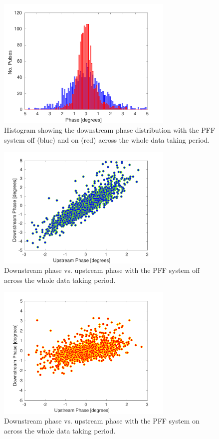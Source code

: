 \begin{figure}
  \centering
  \includegraphics[width=0.75\textwidth]{Figures/feedforward/longFF_histDownstreamPhase}
  \caption{Histogram showing the downstream phase distribution with the PFF system off (blue) and on (red) across the whole data taking period.}
  \label{f:longFF_histDownstreamPhase}
\end{figure}

\begin{figure}
  \centering
  \includegraphics[width=0.75\textwidth]{Figures/feedforward/longFF_scatterFFOff}
  \caption{Downstream phase vs. upstream phase with the PFF system off across the whole data taking period.}
  \label{f:longFF_scatterFFOff}
\end{figure}

\begin{figure}
  \centering
  \includegraphics[width=0.75\textwidth]{Figures/feedforward/longFF_scatterFFOn}
  \caption{Downstream phase vs. upstream phase with the PFF system on across the whole data taking period.}
  \label{f:longFF_scatterFFOn}
\end{figure}

